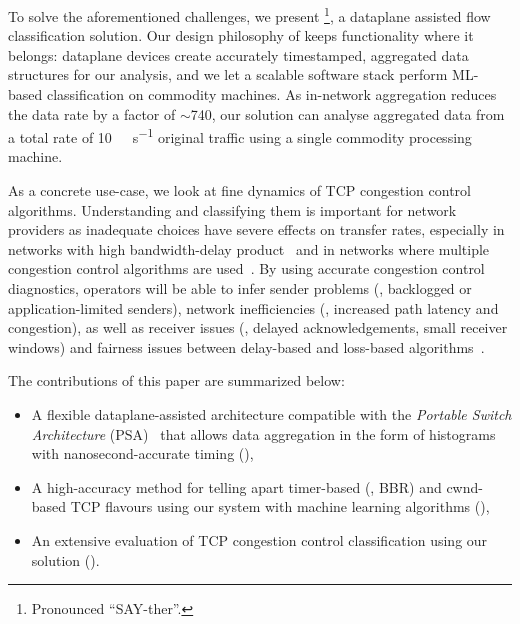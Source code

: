 
To solve the aforementioned challenges, we present \seidr{}\footnote{Pronounced ``SAY-ther''.}, a dataplane assisted flow classification solution.
Our design philosophy of \seidr{} keeps functionality where it belongs: dataplane devices create accurately timestamped, aggregated data structures for our analysis, and we let a scalable software stack perform ML-based classification on commodity machines.
As in-network aggregation reduces the data rate by a factor of $\sim$\num{740}, our solution can analyse aggregated data from a total rate of \SI{10}{\tera\bit\per\second} original traffic using a single commodity processing machine.

As a concrete use-case, we look at fine dynamics of TCP congestion control algorithms.
Understanding and classifying them is important for network providers as inadequate choices have severe effects on transfer rates, especially in networks with high bandwidth-delay product~\cite{cardwell2016bbr} and in networks where multiple congestion control algorithms are used~\cite{DBLP:conf/imc/WareMSS19}. 
By using accurate congestion control diagnostics, operators will be able to infer sender problems (\eg, backlogged or application-limited senders), network inefficiencies (\eg, increased path latency and congestion), as well as receiver issues (\eg, delayed acknowledgements, small receiver windows) and fairness issues between delay-based and loss-based algorithms~\cite{DBLP:conf/imc/WareMSS19}.

The contributions of this paper are summarized below:
\begin{itemize}
	\item A flexible dataplane-assisted architecture compatible with the \emph{Portable Switch Architecture} (PSA)~\cite{p4-psa} that allows data aggregation in the form of histograms with nanosecond-accurate timing (),
	\item A high-accuracy method for telling apart timer-based (\eg, BBR) and cwnd-based TCP flavours using our system with machine learning algorithms (),
	\item An extensive evaluation of TCP congestion control classification using our solution ().
\end{itemize}

